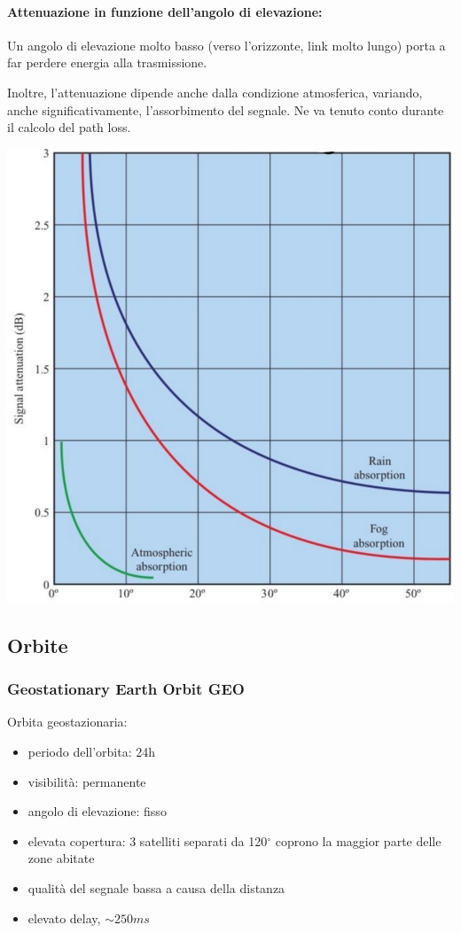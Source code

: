 \paragraph{Attenuazione in funzione dell'angolo di elevazione:} Un angolo di elevazione molto basso (verso l'orizzonte, link molto lungo) porta a far perdere energia alla trasmissione.

Inoltre, l'attenuazione dipende anche dalla condizione atmosferica, variando, anche significativamente, l'assorbimento del segnale. Ne va tenuto conto durante il calcolo del path loss.

\begin{center}
	\includegraphics[width=0.65\linewidth]{img/sat/atten}
\end{center}

\subsection{Orbite}

\subsubsection{Geostationary Earth Orbit GEO}

Orbita geostazionaria:
\begin{itemize}
	\item periodo dell'orbita: 24h

	\item visibilità: permanente

	\item angolo di elevazione: fisso

	\item elevata copertura: 3 satelliti separati da 120$^\circ$ coprono la maggior parte delle zone abitate

	\item qualità del segnale bassa a causa della distanza

	\item elevato delay, $\sim 250ms$
\end{itemize}

